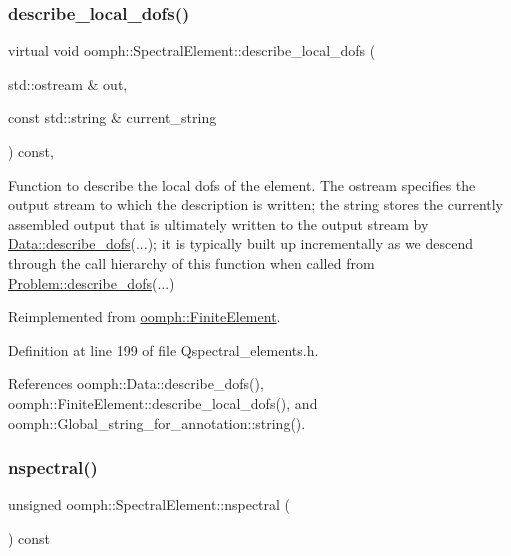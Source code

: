\subsubsection{\texorpdfstring{describe\+\_\+local\+\_\+dofs()}{describe\_local\_dofs()}}
{\footnotesize\ttfamily virtual void oomph\+::\+Spectral\+Element\+::describe\+\_\+local\+\_\+dofs (\begin{DoxyParamCaption}\item[{std\+::ostream \&}]{out,  }\item[{const std\+::string \&}]{current\+\_\+string }\end{DoxyParamCaption}) const\hspace{0.3cm}{\ttfamily [inline]}, {\ttfamily [virtual]}}



Function to describe the local dofs of the element. The ostream specifies the output stream to which the description is written; the string stores the currently assembled output that is ultimately written to the output stream by \hyperlink{classoomph_1_1Data_a2dae16e2dcff9a40029f834c83364df5}{Data\+::describe\+\_\+dofs}(...); it is typically built up incrementally as we descend through the call hierarchy of this function when called from \hyperlink{classoomph_1_1Problem_abc103804eb319ae0b3d43870cc3e1eaf}{Problem\+::describe\+\_\+dofs}(...) 



Reimplemented from \hyperlink{classoomph_1_1FiniteElement_aad9f9ebb2996fd9c44caf34da8bc7941}{oomph\+::\+Finite\+Element}.



Definition at line 199 of file Qspectral\+\_\+elements.\+h.



References oomph\+::\+Data\+::describe\+\_\+dofs(), oomph\+::\+Finite\+Element\+::describe\+\_\+local\+\_\+dofs(), and oomph\+::\+Global\+\_\+string\+\_\+for\+\_\+annotation\+::string().

\mbox{\label{classoomph_1_1SpectralElement_a930a352d4345327c8751165fa1e49a7b}} 
\subsubsection{\texorpdfstring{nspectral()}{nspectral()}}
{\footnotesize\ttfamily unsigned oomph\+::\+Spectral\+Element\+::nspectral (\begin{DoxyParamCaption}{ }\end{DoxyParamCaption}) const\hspace{0.3cm}{\ttfamily [inline]}}



